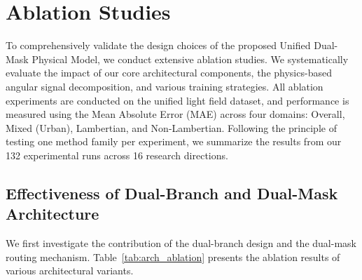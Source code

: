\section{Ablation Studies}

To comprehensively validate the design choices of the proposed Unified Dual-Mask Physical Model, we conduct extensive ablation studies. We systematically evaluate the impact of our core architectural components, the physics-based angular signal decomposition, and various training strategies. All ablation experiments are conducted on the unified light field dataset, and performance is measured using the Mean Absolute Error (MAE) across four domains: Overall, Mixed (Urban), Lambertian, and Non-Lambertian. Following the principle of testing one method family per experiment, we summarize the results from our 132 experimental runs across 16 research directions.

\subsection{Effectiveness of Dual-Branch and Dual-Mask Architecture}

We first investigate the contribution of the dual-branch design and the dual-mask routing mechanism. Table~\ref{tab:arch_ablation} presents the ablation results of various architectural variants. 

\begin{table}[!t]
\centering
\caption{Ablation Study on Architectural Components and Routing Mechanisms. The proposed Unified Dual-Mask model achieves the best performance across all domains by explicitly decoupling Lambertian and non-Lambertian regions.}
\label{tab:arch_ablation}
\end{table}

